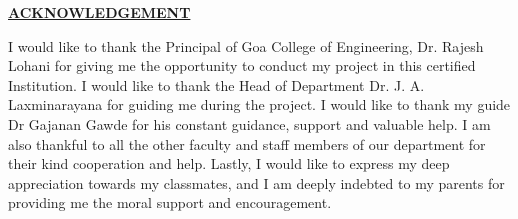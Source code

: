 \begin{center}
    \underline{\bfseries \huge ACKNOWLEDGEMENT}\\
    \vspace{1cm}
    \end{center}
    \noindent I would like to thank the Principal of Goa College of Engineering, Dr. Rajesh Lohani for
    giving me the opportunity to conduct my project in this certified Institution. I would like
    to thank the Head of Department Dr. J. A. Laxminarayana for guiding me during the
    project. I would like to thank my guide Dr Gajanan Gawde for his constant
    guidance, support and valuable help. I am also thankful to all the other faculty and staff
    members of our department for their kind cooperation and help. Lastly, I would like to
    express my deep appreciation towards my classmates, and I am deeply indebted to
    my parents for providing me the moral support and encouragement.
